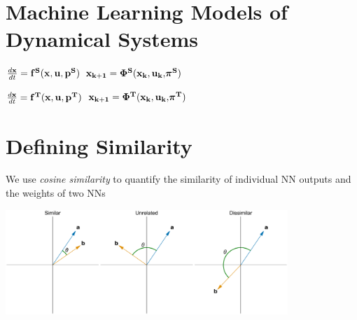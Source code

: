 \documentclass[a0paper,fleqn]{betterposter}
\newcommand{\source}{\mathrm{\bf{S}}}
\newcommand{\target}{\mathrm{\bf{T}}}
\newcommand{\D}{\mathcal{D}}
\newcommand{\nn}{\bm \Phi}
\newcommand{\sourceD}{\D^\source}
\newcommand{\targetD}{\D^\target}
\newcommand{\sourceNN}{\nn^\source}
\newcommand{\targetNN}{\nn^\target}
\newcommand{\f}{\mathrm{\bf{f}}}
\newcommand{\fSource}{\f^\source}
\newcommand{\fTarget}{\f^\target}
\begin{document}
{\section{Machine Learning Models of Dynamical Systems}
$\frac{d\bf{x}}{dt} = \f^\source(\bf{x}, \bf{u}, \bf{p^\source})$
\hspace{5em} ${\bf{x}_{k+1}} = {\bf{\Phi}^\source(\bf{x}_k, \bf{u}_k,} \bm{\pi}^\source)$\par
$\frac{d\bf{x}}{dt} = \f^\target(\bf{x}, \bf{u}, \bf{p^\target})$
\hspace{5em} ${\bf{x}_{k+1}} = {\bf{\Phi}^\target(\bf{x}_k, \bf{u}_k,} \bm{\pi}^\target)$\par

\vfill
\section{Defining Similarity}
We use \textit{cosine similarity} to quantify the similarity of individual NN outputs and the weights of two NNs

\begin{center}
    \includegraphics[width=0.8\textwidth]{img/cosineSimilarity}
\end{center}

}
\end{document}
